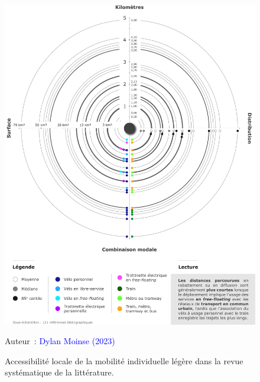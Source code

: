 \begin{refsegment}
    \begin{figure}[h!]\vspace*{4pt}
        \caption{Accessibilité locale de la mobilité individuelle légère dans la revue systématique de la littérature.}
        \label{fig-chap2:distances-estimees-rsl}
        \centerline{\includegraphics[width=1\columnwidth]{src/Figures/Chap-2/FR_RSL_Aires_influence.pdf}}
        \vspace{5pt}
        \begin{flushright}\scriptsize{
        Auteur~: \textcolor{blue}{Dylan Moinse (2023)}
        }\end{flushright}
    \end{figure}
    

\end{refsegment}
